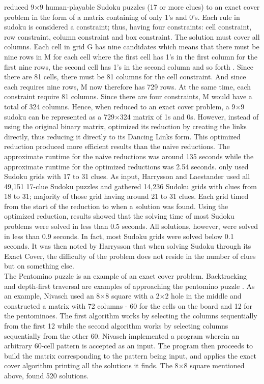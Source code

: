 \documentclass[a4paper,oneside,11pt]{report}
\begin{document}
	\cite{Harrysson} reduced 9$\times$9 human-playable Sudoku puzzles (17 or more clues) to an exact cover problem in the form of a matrix containing of only 1’s and 0’s. Each rule in sudoku is considered a constraint; thus, having four constraints: cell constraint, row constraint, column constraint and box constraint. The solution must cover all columns. Each cell in grid G has nine candidates which means that there must be nine rows in M for each cell where the first cell has 1’s in the first column for the first nine rows, the second cell has 1’s in the second column and so forth \cite{Harrysson}. Since there are 81 cells, there must be 81 columns for the cell constraint. And since each requires nine rows, M now therefore has 729 rows. At the same time, each constraint require 81 columns. Since there are four constraints, M would have a total of 324 columns. Hence, when reduced to an exact cover problem, a 9$\times$9 sudoku can be represented as a 729$\times$324 matrix of 1s and 0s. However, instead of using the original binary matrix, \cite{Harrysson} optimized its reduction by creating the links directly, thus reducing it directly to its Dancing Links form. This optimized reduction produced more efficient results than the naive reductions. The approximate runtime for the naive reductions was around 135 seconds while the approximate runtime for the optimized reductions was 2.54 seconds. \cite{Harrysson} only used Sudoku grids with 17 to 31 clues. As input, Harrysson and Laestander used all 49,151 17-clue Sudoku puzzles and gathered 14,236 Sudoku grids with clues from 18 to 31; majority of those grid having around 21 to 31 clues. Each grid timed from the start of the reduction to when a solution was found. Using the optimized reduction, results showed that the solving time of most Sudoku problems were solved in less than 0.5 seconds. All solutions, however, were solved in less than 0.9 seconds. In fact, most Sudoku grids were solved below 0.1 seconds. It was then noted by Harrysson that when solving Sudoku through its Exact Cover, the difficulty of the problem does not reside in the number of clues but on something else.\\
	
		The Pentomino puzzle is an example of an exact cover problem. Backtracking and depth-first traversal are examples of approaching the pentomino puzzle \cite{Nivasch}. As an example, Nivasch used an 8$\times$8 square with a 2$\times$2 hole in the middle and constructed a matrix with 72 columns - 60 for the cells on the board and 12 for the pentominoes. The first algorithm works by selecting the columns sequentially from the first 12 while the second algorithm works by selecting columns sequentially from the other 60. Nivasch implemented a program wherein an arbitrary 60-cell pattern is accepted as an input. The program then proceeds to build the matrix corresponding to the pattern being input, and applies the exact cover algorithm printing all the solutions it finds. The 8$\times$8 square mentioned above, found 520 solutions.\\
		
\end{document}
